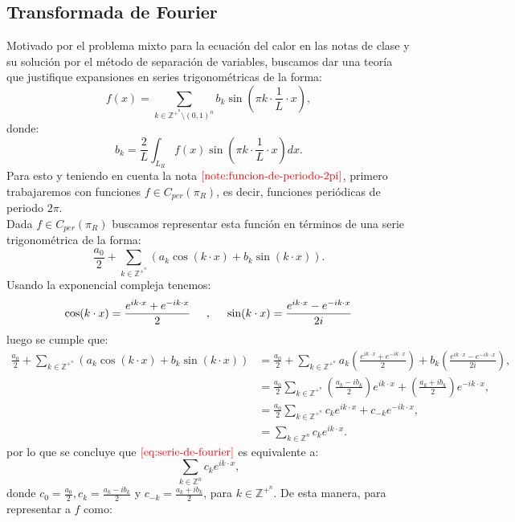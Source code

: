   \subsection{Transformada de Fourier}
    Motivado por el problema mixto para la ecuación del calor en las notas de clase y su solución por el método de separación de variables, buscamos dar una teoría que justifique expansiones en series trigonométricas de la forma:
    $$f(x)=\sum_{k\in\mathbb{Z}^{+^n}\setminus (0,1)^{n}}b_k\sin\left( \pi k\cdot \frac{1}{L}\cdot x \right),$$
    donde:
    $$b_k=\frac{2}{L}\int_{L_R}f(x)\sin\left( \pi k\cdot \frac{1}{L}\cdot x \right)dx.$$
    Para esto y teniendo en cuenta la nota $\textcolor{red}{\ref{note:funcion-de-periodo-2pi}}$, primero trabajaremos con funciones $f\in C_{per}(\pi_R)$, es decir, funciones periódicas de periodo $2\pi$.\\
    Dada $f \in C_{per}(\pi_R)$ buscamos representar esta función en términos de una serie trigonométrica de la forma:
    \begin{equation}
      \frac{a_0}{2}+\sum_{k\in\mathbb{Z}^{+^n}}(a_k\cos(k\cdot x)+b_k\sin(k\cdot x)).\label{eq:serie-de-fourier}  
    \end{equation}
    Usando la exponencial compleja tenemos:
    \begin{align*}
      \cos(k\cdot x)=\frac{e^{ik\cdot x}+e^{-ik\cdot x}}{2}\hspace{0.5cm},\hspace{0.5cm}\sin(k\cdot x)=\frac{e^{ik\cdot x}-e^{-ik\cdot x}}{2i}  
    \end{align*}
    luego se cumple que:
    \begin{align*}
        \frac{a_0}{2}+\sum_{k\in\mathbb{Z}^{+^n}}(a_k\cos(k\cdot x)+b_k\sin(k\cdot x))&=\frac{a_0}{2}+\sum_{k\in\mathbb{Z}^{+^n}}a_k(\frac{e^{ik\cdot x}+e^{-ik\cdot x}}{2})+b_k(\frac{e^{ik\cdot x}-e^{-ik\cdot x}}{2i}),\\
        &=\frac{a_0}{2}\sum_{k\in\mathbb{Z}^{+^n}}\left(\frac{a_k-ib_k}{2}\right)e^{ik\cdot x}+\left(\frac{a_k+ib_k}{2}\right)e^{-ik\cdot x},\\
        &=\frac{a_0}{2}\sum_{k\in \mathbb{Z}^{+^n}}c_ke^{ik\cdot x}+c_{-k}e^{-ik\cdot x},\\
        &=\sum_{k\in\mathbb{Z}^n}c_ke^{ik\cdot x}.
    \end{align*}
    por lo que se concluye que $\textcolor{red}{\ref{eq:serie-de-fourier}}$ es equivalente a:
    $$\sum_{k\in\mathbb{Z}^{n}}c_ke^{ik\cdot x},$$
    donde $c_0=\frac{a_0}{2},c_k=\frac{a_k-ib_k}{2}$ y $c_{-k}=\frac{a_k+ib_k}{2}$, para $k\in\mathbb{Z}^{+^{n}}$. De esta manera, para representar a $f$ como:
